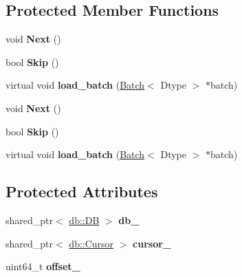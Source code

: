 \subsection*{Protected Member Functions}
\begin{DoxyCompactItemize}
\item 
\mbox{\label{classcaffe_1_1_data_layer_a16238c3e219f4215faa4da08f670551f}} 
void {\bfseries Next} ()
\item 
\mbox{\label{classcaffe_1_1_data_layer_a230e84eafe73df8e7da3c41b2e3430e1}} 
bool {\bfseries Skip} ()
\item 
\mbox{\label{classcaffe_1_1_data_layer_a5f14e385399a658476642d225a2827f9}} 
virtual void {\bfseries load\+\_\+batch} (\mbox{\hyperlink{classcaffe_1_1_batch}{Batch}}$<$ Dtype $>$ $\ast$batch)
\item 
\mbox{\label{classcaffe_1_1_data_layer_a16238c3e219f4215faa4da08f670551f}} 
void {\bfseries Next} ()
\item 
\mbox{\label{classcaffe_1_1_data_layer_a230e84eafe73df8e7da3c41b2e3430e1}} 
bool {\bfseries Skip} ()
\item 
\mbox{\label{classcaffe_1_1_data_layer_adbf71834c88664241b85f939a145bcd2}} 
virtual void {\bfseries load\+\_\+batch} (\mbox{\hyperlink{classcaffe_1_1_batch}{Batch}}$<$ Dtype $>$ $\ast$batch)
\end{DoxyCompactItemize}
\subsection*{Protected Attributes}
\begin{DoxyCompactItemize}
\item 
\mbox{\label{classcaffe_1_1_data_layer_ab7dfcf76d49ab2a03fa6e751f5499b3a}} 
shared\+\_\+ptr$<$ \mbox{\hyperlink{classcaffe_1_1db_1_1_d_b}{db\+::\+DB}} $>$ {\bfseries db\+\_\+}
\item 
\mbox{\label{classcaffe_1_1_data_layer_ada8eafe2b61db9e157b4393edf449d3f}} 
shared\+\_\+ptr$<$ \mbox{\hyperlink{classcaffe_1_1db_1_1_cursor}{db\+::\+Cursor}} $>$ {\bfseries cursor\+\_\+}
\item 
\mbox{\label{classcaffe_1_1_data_layer_a1af404785922d764270d7d5a195d90df}} 
uint64\+\_\+t {\bfseries offset\+\_\+}
\end{DoxyCompactItemize}


